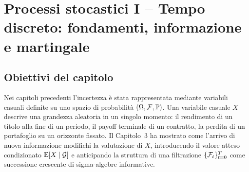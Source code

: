 



\chapter{Processi stocastici I -- Tempo discreto: fondamenti, informazione e
martingale}

\label{cap:processi}

\section{Obiettivi del capitolo}

Nei capitoli precedenti l'incertezza \`{e} stata rappresentata mediante
variabili casuali definite su uno spazio di probabilit\`{a}
$(\Omega,\mathcal{F},\mathbb{P})$. Una variabile casuale $X$ descrive una grandezza
aleatoria in un singolo momento: il rendimento di un titolo alla fine di un
periodo, il payoff terminale di un contratto, la perdita di un portafoglio su
un orizzonte fissato. Il Capitolo~3 ha mostrato come l'arrivo di nuova
informazione modifichi la valutazione di $X$, introducendo il valore atteso
condizionato $\mathbb{E}[X\mid\mathcal{G}]$ e anticipando la struttura di una filtrazione
$\{\mathcal{F}_t\}_{t=0}^{T}$ come successione crescente di sigma-algebre
informative.

